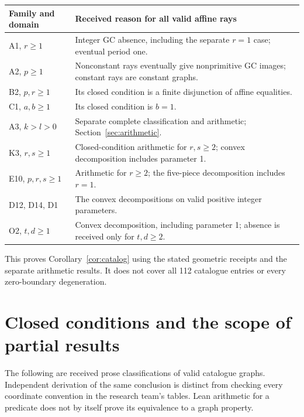 \documentclass[11pt]{amsart}
\theoremstyle{definition}\newtheorem{definition}{Definition}
\begin{document}
\begin{center}\small
\begin{tabular}{p{}p{}}\toprule
Family and domain & Received reason for all valid affine rays\\\midrule
A1, $r\ge1$ & Integer GC absence, including the separate $r=1$ case; eventual period one.\\
A2, $p\ge1$ & Nonconstant rays eventually give nonprimitive GC images; constant rays are constant graphs.\\
B2, $p,r\ge1$ & Its closed condition is a finite disjunction of affine equalities.\\
C1, $a,b\ge1$ & Its closed condition is $b=1$.\\
A3, $k>l>0$ & Separate complete classification and arithmetic; Section~\ref{sec:arithmetic}.\\
K3, $r,s\ge1$ & Closed-condition arithmetic for $r,s\ge2$; convex decomposition includes parameter 1.\\
E10, $p,r,s\ge1$ & Arithmetic for $r\ge2$; the five-piece decomposition includes $r=1$.\\
D12, D14, D1 & The convex decompositions on valid positive integer parameters.\\
O2, $t,d\ge1$ & Convex decomposition, including parameter 1; absence is received only for $t,d\ge2$.\\\bottomrule
\end{tabular}
\end{center}
This proves Corollary~\ref{cor:catalog} using the stated geometric
receipts and the separate arithmetic results. It does not cover all
112 catalogue entries or every zero-boundary degeneration.

\section{Closed conditions and the scope of partial results}\label{sec:conditions}
The following are received prose classifications of valid catalogue
graphs. Independent derivation of the same conclusion is distinct
from checking every coordinate convention in the research team's
tables. Lean arithmetic for a predicate does not by itself prove its
equivalence to a graph property.
\end{document}
